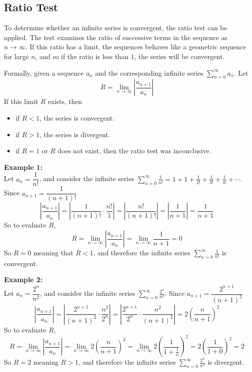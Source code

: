 \subsection*{Ratio Test}
To determine whether an infinite series is convergent, the ratio test can be applied. The test examines the ratio of successive terms in the sequence as $n \to \infty$. If this ratio has a limit, the sequences behaves like a geometric sequence for large $n$, and so if the ratio is less than $1$, the series will be convergent.

Formally, given a sequence $a_n$ and the corresponding infinite series $\displaystyle \sum_{n=0}^\infty a_n$. Let
\begin{equation*}
  R=\lim_{n \to \infty} \left|\frac{a_{n+1}}{a_n}\right|
\end{equation*}
If this limit $R$ exists, then
\begin{itemize}
\item if $R<1$, the series is convergent.
\item if $R>1$, the series is divergent.
\item if $R=1$ or $R$ does not exist, then the ratio test was inconclusive.
\end{itemize}
\noindent  \textbf{Example 1:}\\
Let $a_n=\dfrac{1}{n!}$, and consider the infinite series $\displaystyle \sum_{n=0}^{\infty} \frac{1}{n!} = 1+1+\frac{1}{2!}+\frac{1}{3!}+\frac{1}{4!}+\cdots$. Since $a_{n+1}=\dfrac{1}{(n+1)!}$
\begin{equation*}
  \left| \frac{a_{n+1}}{a_n}\right|=\left| \frac{1}{(n+1)!}\cdot \frac{n!}{1}\right|=\left| \frac{n!}{(n+1)!}\right|=\left| \frac{1}{n+1}\right|=\frac{1}{n+1}
\end{equation*}
So to evaluate $R$,
\begin{equation*}
  R=\lim_{n \to \infty} \left|\frac{a_{n+1}}{a_n}\right|=\lim_{n \to \infty} \frac{1}{n+1}=0
\end{equation*}
So $R=0$ meaning that $R<1$, and therefore the infinite series $ \sum_{n=0}^{\infty} \frac{1}{n!}$ is convergent.

\noindent  \textbf{Example 2:}\\
Let $a_n=\dfrac{2^n}{n^2}$, and consider the infinite series $\displaystyle \sum_{n=0}^{\infty} \frac{2^n}{n^2}$. Since $a_{n+1}=\dfrac{2^{n+1}}{(n+1)^2}$
\begin{equation*}
  \left| \frac{a_{n+1}}{a_n}\right|=\left| \frac{2^{n+1}}{(n+1)^2}\cdot \frac{n^2}{2^n}\right|=\left| \frac{2^{n+1}}{2^n}\cdot\frac{n^2}{(n+1)^2}\right|=2 \left(\frac{n}{n+1}\right)^2
\end{equation*}
So to evaluate $R$,
\begin{equation*}
  R=\lim_{n \to \infty} \left|\frac{a_{n+1}}{a_n}\right|=\lim_{n \to \infty} 2 \left(\frac{n}{n+1}\right)^2=\lim_{n \to \infty} 2 \left(\frac{1}{1+\frac{1}{n}}\right)^2=2\left(\frac{1}{1+0}\right)^2=2
\end{equation*}
So $R=2$ meaning $R>1$, and therefore the infinite series $\displaystyle \sum_{n=0}^{\infty} \frac{2^n}{n^2}$ is divergent.

